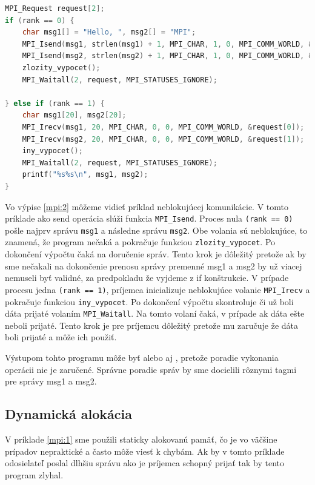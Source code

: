 \begin{lstlisting}[language=c, caption={Neblokujúca komunikácia}, label={mpi:2}]
MPI_Request request[2];
if (rank == 0) {
    char msg1[] = "Hello, ", msg2[] = "MPI";
    MPI_Isend(msg1, strlen(msg1) + 1, MPI_CHAR, 1, 0, MPI_COMM_WORLD, &request[0]);
    MPI_Isend(msg2, strlen(msg2) + 1, MPI_CHAR, 1, 0, MPI_COMM_WORLD, &request[1]);
    zlozity_vypocet();
    MPI_Waitall(2, request, MPI_STATUSES_IGNORE);

} else if (rank == 1) {
    char msg1[20], msg2[20];
    MPI_Irecv(msg1, 20, MPI_CHAR, 0, 0, MPI_COMM_WORLD, &request[0]);
    MPI_Irecv(msg2, 20, MPI_CHAR, 0, 0, MPI_COMM_WORLD, &request[1]);
    iny_vypocet();
    MPI_Waitall(2, request, MPI_STATUSES_IGNORE);
    printf("%s%s\n", msg1, msg2);
}
\end{lstlisting}

Vo výpise \ref{mpi:2} môžeme vidieť príklad neblokujúcej komunikácie. V tomto príklade ako send operácia slúži funkcia \texttt{MPI\_Isend}.
Proces nula \texttt{(rank == 0)} pošle najprv správu \texttt{msg1} a následne správu \texttt{msg2}.
Obe volania sú neblokujúce, to znamená, že program nečaká
a pokračuje funkciou \texttt{zlozity\_vypocet}. Po dokončení výpočtu čaká na doručenie správ.
Tento krok je dôležitý pretože ak by sme nečakali na dokončenie prenosu správy premenné msg1 a msg2 by už viacej nemuseli byť validné,
za predpokladu že vyjdeme z if konštrukcie.
V prípade procesu jedna \texttt{(rank == 1)}, príjemca inicializuje neblokujúce volanie \texttt{MPI\_Irecv} a pokračuje funkciou \texttt{iny\_vypocet}.
Po dokončení výpočtu skontroluje či už boli dáta prijaté volaním \texttt{MPI\_Waitall}.
Na tomto volaní čaká, v prípade ak dáta ešte neboli prijaté.
Tento krok je pre príjemcu dôležitý pretože mu zaručuje že dáta boli prijaté a môže ich použiť.

Výstupom tohto programu môže byť  alebo aj , pretože poradie vykonania operácii nie je zaručené.
Správne poradie správ by sme docielili rôznymi tagmi pre správy msg1 a msg2.
\subsection{Dynamická alokácia}
V príklade \ref{mpi:1} sme použili staticky alokovanú pamäť, čo je vo väčšine prípadov nepraktické a často môže viesť k chybám.
Ak by v tomto príklade odosielateľ poslal dlhšiu správu ako je príjemca schopný prijať tak by tento program zlyhal.

